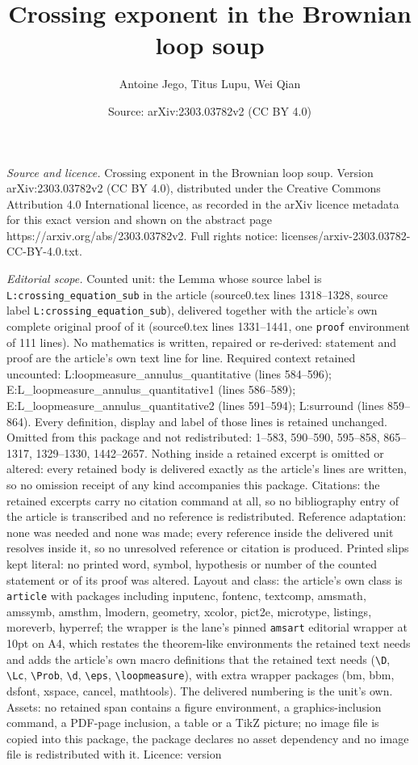 \documentclass[10pt,a4paper]{amsart}
\title[Crossing exponent in the Brownian loop soup]{Crossing exponent in the Brownian loop soup}
\author{Antoine Jego, Titus Lupu, Wei Qian}
\date{Source: arXiv:2303.03782v2 (CC BY 4.0)}
\begin{document}
\maketitle

\noindent\emph{Source and licence.} Crossing exponent in the Brownian loop soup. Version arXiv:2303.03782v2 (CC BY 4.0), distributed under the Creative Commons Attribution 4.0 International licence, as recorded in the arXiv licence metadata for this exact version and shown on the abstract page https://arxiv.org/abs/2303.03782v2. Full rights notice: licenses/arxiv-2303.03782-CC-BY-4.0.txt.\par\smallskip

\noindent\textit{Editorial scope.} Counted unit: the Lemma whose source label is \texttt{L:crossing\_equation\_sub} in the article (source0.tex lines 1318--1328, source label \texttt{L:crossing\_equation\_sub}), delivered together with the article's own complete original proof of it (source0.tex lines 1331--1441, one \texttt{proof} environment of 111 lines). No mathematics is written, repaired or re-derived: statement and proof are the article's own text line for line. Required context retained uncounted: L:loopmeasure\_annulus\_quantitative (lines 584--596); E:L\_loopmeasure\_annulus\_quantitative1 (lines 586--589); E:L\_loopmeasure\_annulus\_quantitative2 (lines 591--594); L:surround (lines 859--864). Every definition, display and label of those lines is retained unchanged. Omitted from this package and not redistributed: 1--583, 590--590, 595--858, 865--1317, 1329--1330, 1442--2657. Nothing inside a retained excerpt is omitted or altered: every retained body is delivered exactly as the article's lines are written, so no omission receipt of any kind accompanies this package. Citations: the retained excerpts carry no citation command at all, so no bibliography entry of the article is transcribed and no reference is redistributed. Reference adaptation: none was needed and none was made; every reference inside the delivered unit resolves inside it, so no unresolved reference or citation is produced. Printed slips kept literal: no printed word, symbol, hypothesis or number of the counted statement or of its proof was altered. Layout and class: the article's own class is \texttt{article} with packages including inputenc, fontenc, textcomp, amsmath, amssymb, amsthm, lmodern, geometry, xcolor, pict2e, microtype, listings, moreverb, hyperref; the wrapper is the lane's pinned \texttt{amsart} editorial wrapper at 10pt on A4, which restates the theorem-like environments the retained text needs and adds the article's own macro definitions that the retained text needs (\texttt{\textbackslash D}, \texttt{\textbackslash Lc}, \texttt{\textbackslash Prob}, \texttt{\textbackslash d}, \texttt{\textbackslash eps}, \texttt{\textbackslash loopmeasure}), with extra wrapper packages (bm, bbm, dsfont, xspace, cancel, mathtools). The delivered numbering is the unit's own. Assets: no retained span contains a figure environment, a graphics-inclusion command, a PDF-page inclusion, a table or a TikZ picture; no image file is copied into this package, the package declares no asset dependency and no image file is redistributed with it. Licence: version 
\end{document}
